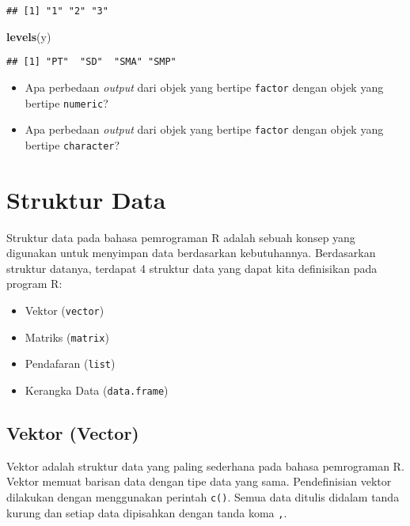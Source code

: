 \documentclass[
]{book}
\newenvironment{Shaded}{\begin{snugshade}}{\end{snugshade}}
\newcommand{\KeywordTok}[1]{\textcolor[rgb]{0.13,0.29,0.53}{\textbf{#1}}}
\newcommand{\NormalTok}[1]{#1}
\providecommand{\tightlist}{%
  \setlength{\itemsep}{0pt}\setlength{\parskip}{0pt}}
\begin{document}
\begin{verbatim}
## [1] "1" "2" "3"
\end{verbatim}

\begin{Shaded}
\begin{Highlighting}[]
\KeywordTok{levels}\NormalTok{(y)}
\end{Highlighting}
\end{Shaded}

\begin{verbatim}
## [1] "PT"  "SD"  "SMA" "SMP"
\end{verbatim}

\begin{itemize}
\tightlist
\item
  Apa perbedaan \emph{output} dari objek yang bertipe \texttt{factor} dengan objek yang bertipe \texttt{numeric}?
\item
  Apa perbedaan \emph{output} dari objek yang bertipe \texttt{factor} dengan objek yang bertipe \texttt{character}?
\end{itemize}

\hypertarget{struktur-data}{%
\chapter{Struktur Data}\label{struktur-data}}

Struktur data pada bahasa pemrograman R adalah sebuah konsep yang digunakan untuk menyimpan data berdasarkan kebutuhannya. Berdasarkan struktur datanya, terdapat 4 struktur data yang dapat kita definisikan pada program R:

\begin{itemize}
\tightlist
\item
  Vektor (\texttt{vector})
\item
  Matriks (\texttt{matrix})
\item
  Pendafaran (\texttt{list})
\item
  Kerangka Data (\texttt{data.frame})
\end{itemize}

\hypertarget{vector}{%
\section{Vektor (Vector)}\label{vector}}

Vektor adalah struktur data yang paling sederhana pada bahasa pemrograman R. Vektor memuat barisan data dengan tipe data yang sama. Pendefinisian vektor dilakukan dengan menggunakan perintah \texttt{c()}. Semua data ditulis didalam tanda kurung dan setiap data dipisahkan dengan tanda koma \texttt{,}.
\end{document}
